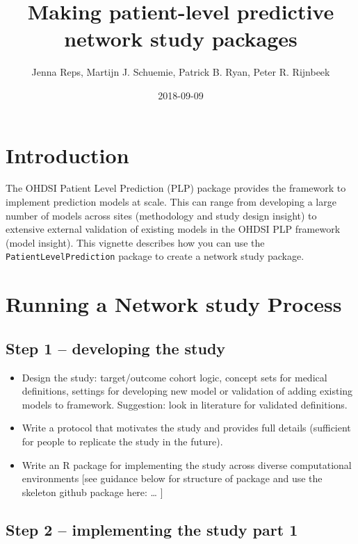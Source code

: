\documentclass[]{article}
\title{Making patient-level predictive network study packages}
\author{Jenna Reps, Martijn J. Schuemie, Patrick B. Ryan, Peter R. Rijnbeek}
\date{2018-09-09}
\providecommand{\tightlist}{%
  \setlength{\itemsep}{0pt}\setlength{\parskip}{0pt}}
\begin{document}
\maketitle

{
\setcounter{tocdepth}{2}
\tableofcontents
}
\newpage

\section{Introduction}\label{introduction}

The OHDSI Patient Level Prediction (PLP) package provides the framework
to implement prediction models at scale. This can range from developing
a large number of models across sites (methodology and study design
insight) to extensive external validation of existing models in the
OHDSI PLP framework (model insight). This vignette describes how you can
use the \texttt{PatientLevelPrediction} package to create a network
study package.

\section{Running a Network study
Process}\label{running-a-network-study-process}

\subsection{Step 1 -- developing the
study}\label{step-1-developing-the-study}

\begin{itemize}
\tightlist
\item
  Design the study: target/outcome cohort logic, concept sets for
  medical definitions, settings for developing new model or validation
  of adding existing models to framework. Suggestion: look in literature
  for validated definitions.
\item
  Write a protocol that motivates the study and provides full details
  (sufficient for people to replicate the study in the future).
\item
  Write an R package for implementing the study across diverse
  computational environments {[}see guidance below for structure of
  package and use the skeleton github package here: \ldots{} {]}
\end{itemize}

\subsection{Step 2 -- implementing the study part
1}\label{step-2-implementing-the-study-part-1}
\end{document}
